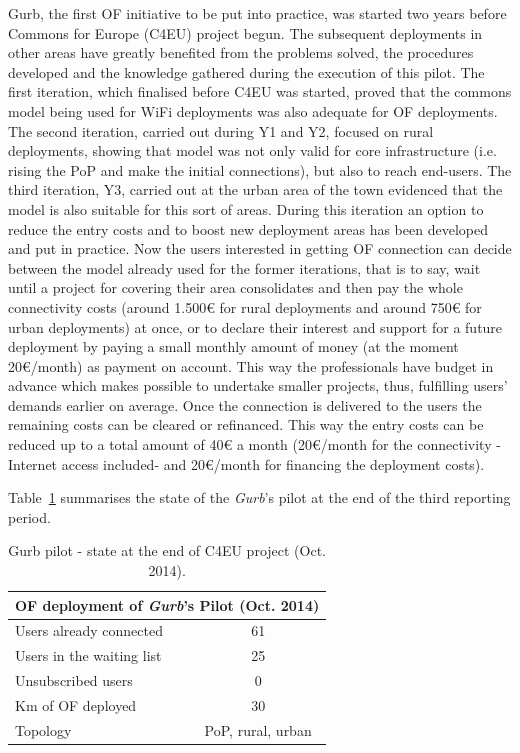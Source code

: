 Gurb, the first OF initiative to be put into practice, was started two years before Commons for Europe (C4EU) project begun. The subsequent deployments in other areas have greatly benefited from the problems solved, the procedures developed and the knowledge gathered during the execution of this pilot. The first iteration, which finalised before C4EU was started, proved that the commons model being used for WiFi deployments was also adequate for OF deployments. The second iteration, carried out during Y1 and Y2, focused on rural deployments, showing that model was not only valid for core infrastructure (i.e. rising the PoP and make the initial connections), but also to reach end-users. The third iteration, Y3, carried out at the urban area of the town evidenced that the model is also suitable for this sort of areas. During this iteration an option to reduce the entry costs and to boost new deployment areas has been developed and put in practice. Now the users interested in getting OF connection can decide between the model already used for the former iterations, that is to say, wait until a project for covering their area consolidates and then pay the whole connectivity costs (around 1.500\euro{} for rural deployments and around 750\euro{} for urban deployments) at once, or to declare their interest and support for a future deployment by paying a small monthly amount of money (at the moment 20\euro{}/month) as payment on account. This way the professionals have budget in advance which makes possible to undertake smaller projects, thus, fulfilling users' demands earlier on average. Once the connection is delivered to the users the remaining costs can be cleared or refinanced. This way the entry costs can be reduced up to a total amount of 40\euro{} a month (20\euro{}/month for the connectivity -Internet access included- and 20\euro{}/month for financing the deployment costs).

Table~\ref{tab:gurb} summarises the state of the \emph{Gurb}'s pilot at the end of the third reporting period. 

\begin{table}[H]\small
  \begin{center}
    \begin{tabular}{|l|c|}
      \hline
      \multicolumn{2}{|c|}{\textbf{OF deployment of \emph{Gurb}'s Pilot (Oct. 2014)}} \\
      \hline
      \hline
      Users already connected & 61 \\
      \hline
      Users in the waiting list & 25 \\
      \hline
      Unsubscribed users & 0 \\
      \hline
      Km of OF deployed & 30 \\
      \hline
      Topology & PoP, rural, urban \\
      \hline
    \end{tabular}
    \caption[Gurb pilot - state at the end of C4EU project (Oct. 2014)]{Gurb pilot - state at the end of C4EU project (Oct. 2014).}
    \label{tab:gurb}
  \end{center}
\end{table}

